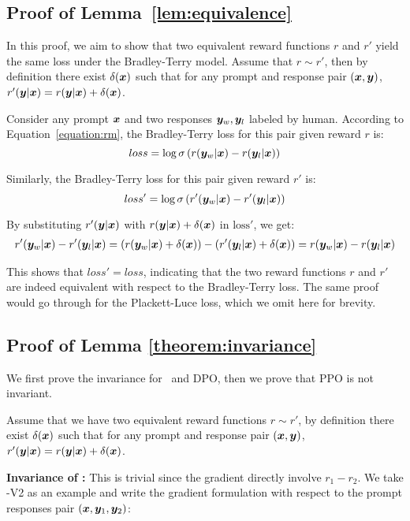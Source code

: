 \documentclass{article} %
\newcommand{\algn}{\text{P3O}}
\begin{document}
\subsection{Proof of Lemma~\ref{lem:equivalence}}
\label{proof:equivalence}
 In this proof, we aim to show that two equivalent reward functions $r$ and $r'$ yield the same loss under the Bradley-Terry model. Assume that $r\sim r'$, then by definition there exist $\delta({\bm{x}})$ such that for any prompt and response pair $({\bm{x}},{\bm{y}})$, $r'({\bm{y}}|{\bm{x}}) = r({\bm{y}}|{\bm{x}}) + \delta({\bm{x}})$. 
 
 Consider any prompt ${\bm{x}}$ and two responses ${\bm{y}}_w,{\bm{y}}_l$ labeled by human. According to Equation~\ref{equation:rm}, the Bradley-Terry loss for this pair given reward $r$ is:
$$loss = \log\sigma\left(r({\bm{y}}_w|{\bm{x}}) - r({\bm{y}}_l|{\bm{x}})\right)$$

Similarly, the Bradley-Terry loss for this pair given reward $r'$ is:
$$loss' = \log\sigma\left(r'({\bm{y}}_w|{\bm{x}}) - r'({\bm{y}}_l|{\bm{x}})\right)$$

By substituting $r'({\bm{y}}|{\bm{x}})$ with $r({\bm{y}}|{\bm{x}}) + \delta({\bm{x}})$ in $\text{loss}'$, we get:
\begin{align*}
    r'({\bm{y}}_w|{\bm{x}})-r'({\bm{y}}_l|{\bm{x}}) = \left(r({\bm{y}}_w|{\bm{x}}) +\delta({\bm{x}})\right) - \left(r'({\bm{y}}_l|{\bm{x}}) +\delta({\bm{x}})\right) = r({\bm{y}}_w|{\bm{x}}) - r({\bm{y}}_l|{\bm{x}})
\end{align*}

This shows that $loss' = loss$, indicating that the two reward functions $r$ and $r'$ are indeed equivalent with respect to the Bradley-Terry loss. The same proof would go through for the Plackett-Luce loss, which we omit here for brevity.

\subsection{Proof of Lemma \ref{theorem:invariance}}
We first prove the invariance for \algn\ and DPO, then we prove that PPO is not invariant. 

Assume that we have two equivalent reward functions $r\sim r'$, by definition there exist $\delta({\bm{x}})$ such that for any prompt and response pair $({\bm{x}},{\bm{y}})$, $r'({\bm{y}}|{\bm{x}}) = r({\bm{y}}|{\bm{x}}) + \delta({\bm{x}})$.

\textbf{Invariance of \algn:} This is trivial since the gradient directly involve $r_1-r_2$. We take \algn-V2 as an example and write the gradient formulation with respect to the prompt responses pair $({\bm{x}},{\bm{y}}_1,{\bm{y}}_2)$:
\end{document}
